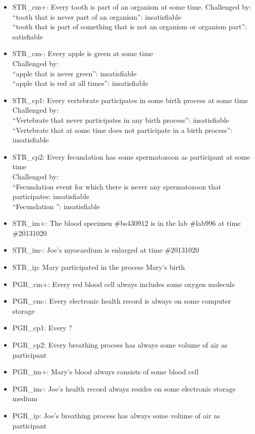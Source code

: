 \begin{itemize}
\item STR\_cm+: Every tooth is part of an organism at some time. Challenged by: \\ ``tooth that is never part of an organism'': insatisfiable \\
``tooth that is part of something that is not an organism or organism part'': satisfiable 



\item STR\_cm-: Every apple is green at some time
\\
Challenged by: \\ ``apple that is never green'': insatisfiable \\
``apple that is red at all times'': insatisfiable 


\item STR\_cp1: Every vertebrate participates in some birth process at some time\\
Challenged by: \\ ``Vertebrate that never participates in any birth process'': insatisfiable \\
``Vertebrate that at some time does not participate in a birth process'': insatisfiable 



\item STR\_cp2: Every fecundation has some spermatozoon as participant at some time
\\
Challenged by: \\ ``Fecundation event for which there is never any spermatozoon that participates: insatisfiable \\
``Fecundation '': insatisfiable 




\item STR\_im+: The blood specimen \#bs430912 is in the lab \#lab996 at time \#20131020
\item STR\_im-: Joe's myocardium is enlarged at time \#20131020
\item STR\_ip:  Mary participated in the process Mary's birth

\item PGR\_cm+: Every red blood cell always includes some oxygen molecule 
\item PGR\_cm-: Every electronic health record is always on some computer storage
\item PGR\_cp1: Every ?  
\item PGR\_cp2: Every breathing process has always some volume of air as participant 
\item PGR\_im+: Mary's blood always consists of some blood cell 
\item PGR\_im-: Joe's health record always resides on some electronic storage medium
\item PGR\_ip:  Joe's breathing process has always some volume of air as participant


\end{itemize}
